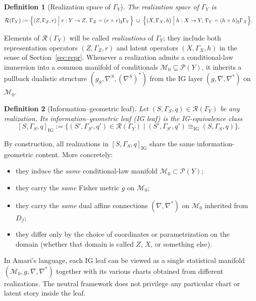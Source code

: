 \documentclass[11pt]{article}
\newtheorem{definition}{Definition}
\newcommand{\1}{\mathbf{1}}
\begin{document}
\begin{definition}[Realization space of $\Gamma_Y$]
\label{def:realization-space}
The \emph{realization space} of $\Gamma_Y$ is
\[
  \mathcal{R}(\Gamma_Y)
  :=
  \Bigl\{
    (Z,\Gamma_Z,r)
    \;\Big|\;
    r:Y\to Z,\;
    \Gamma_Z = (r\times r)_{\sharp}\Gamma_Y
  \Bigr\}
  \;\cup\;
  \Bigl\{
    (X,\Gamma_X,h)
    \;\Big|\;
    h:X\to Y,\;
    \Gamma_Y = (h\times h)_{\sharp}\Gamma_X
  \Bigr\}.
\]
\end{definition}

Elements of $\mathcal{R}(\Gamma_Y)$ will be called \emph{realizations} of $\Gamma_Y$; they include both representation operators $(Z,\Gamma_Z,r)$ and latent operators $(X,\Gamma_X,h)$ in the sense of Section~\ref{sec:repr}. Whenever a realization admits a conditional-law immersion into a common manifold of conditionals $\mathcal{M}_0\subseteq\mathcal{P}(Y)$, it inherits a pullback dualistic structure $(g_S,\nabla^S,(\nabla^S)^\ast)$ from the IG layer $(g,\nabla,\nabla^\ast)$ on $\mathcal{M}_0$.

\begin{definition}[Information--geometric leaf]
\label{def:ig-leaf}
Let $(S,\Gamma_S,q)\in\mathcal{R}(\Gamma_Y)$ be any realization. Its \emph{information--geometric leaf} (IG leaf) is the IG-equivalence class
\[
  [S,\Gamma_S,q]_{\mathrm{IG}}
  :=
  \bigl\{
    (S',\Gamma_{S'},q')\in\mathcal{R}(\Gamma_Y)
    \;\big|\;
    (S',\Gamma_{S'},q')\cong_{\mathrm{IG}}(S,\Gamma_S,q)
  \bigr\}.
\]
\end{definition}

By construction, all realizations in $[S,\Gamma_S,q]_{\mathrm{IG}}$ share the same information-geometric content. More concretely:
\begin{itemize}[leftmargin=1.5em]
  \item they induce the \emph{same} conditional-law manifold
        $\mathcal{M}_0\subset\mathcal{P}(Y)$;
  \item they carry the \emph{same} Fisher metric $g$ on $\mathcal{M}_0$;
  \item they carry the \emph{same} dual affine connections $(\nabla,\nabla^\ast)$ on $\mathcal{M}_0$ inherited from $D_f$;
  \item they differ only by the choice of coordinates or parametrization on the domain (whether that domain is called
        $Z$, $X$, or something else).
\end{itemize}
In Amari's language, each IG leaf can be viewed as a single statistical manifold $(\mathcal{M}_0,g,\nabla,\nabla^\ast)$ together with its various charts obtained from different realizations. The neutral framework does not privilege any particular chart or latent story inside the leaf.
\end{document}
